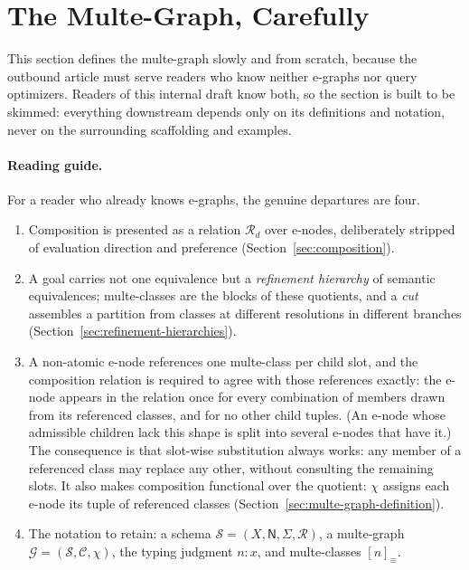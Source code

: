 \documentclass[sigconf,nonacm]{acmart}
\theoremstyle{definition}
\theoremstyle{plain}
\theoremstyle{remark}
\begin{document}
\section{The Multe-Graph, Carefully}
\label{sec:defining-multegraph}

This section defines the multe-graph slowly and from scratch,
because the outbound article must serve readers who know neither
e-graphs nor query optimizers.  Readers of this internal draft know
both, so the section is built to be skimmed: everything downstream
depends only on its definitions and notation, never on the
surrounding scaffolding and examples.

\paragraph{Reading guide.}
For a reader who already knows e-graphs, the genuine departures are
four.

\begin{enumerate}

\item
Composition is presented as a relation \(\mathcal R_d\) over
e-nodes, deliberately stripped of evaluation direction and
preference (Section~\ref{sec:composition}).

\item
A goal carries not one equivalence but a \emph{refinement hierarchy}
of semantic equivalences; multe-classes are the blocks of these
quotients, and a \emph{cut} assembles a partition from classes at
different resolutions in different branches
(Section~\ref{sec:refinement-hierarchies}).

\item
A non-atomic e-node references one multe-class per child slot, and
the composition relation is required to agree with those references
exactly: the e-node appears in the relation once for every
combination of members drawn from its referenced classes, and for no
other child tuples.  (An e-node whose admissible children lack this
shape is split into several e-nodes that have it.)  The consequence
is that slot-wise substitution always works: any member of a
referenced class may replace any other, without consulting the
remaining slots.  It also makes composition functional over the
quotient: \(\chi\) assigns each e-node its tuple of referenced
classes (Section~\ref{sec:multe-graph-definition}).

\item
The notation to retain: a schema
\(\mathcal S=(X,\mathsf N,\Sigma,\mathcal R)\), a multe-graph
\(\mathcal G=(\mathcal S,\mathcal C,\chi)\), the typing judgment
\(n:x\), and multe-classes \([n]_{\equiv}\).

\end{enumerate}
\end{document}
